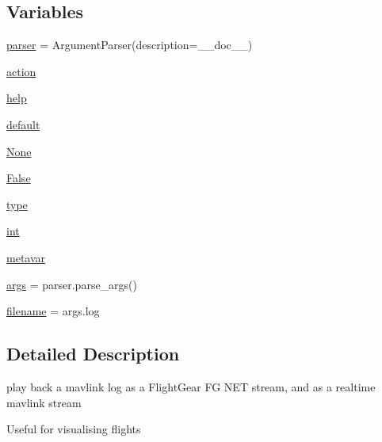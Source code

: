 \subsection*{Variables}
\begin{DoxyCompactItemize}
\item 
\mbox{\hyperlink{namespacepymavlink_1_1tools_1_1mavplayback_ac18db8fa1ca9b23e48f60e5e96e4c551}{parser}} = Argument\+Parser(description=\+\_\+\+\_\+doc\+\_\+\+\_\+)
\item 
\mbox{\hyperlink{namespacepymavlink_1_1tools_1_1mavplayback_a063a8847000068f7337569448c8c6b48}{action}}
\item 
\mbox{\hyperlink{namespacepymavlink_1_1tools_1_1mavplayback_a8188722149f5a81a20277678c5554d6d}{help}}
\item 
\mbox{\hyperlink{namespacepymavlink_1_1tools_1_1mavplayback_a645394812a210b9b5d327607febb11ea}{default}}
\item 
\mbox{\hyperlink{namespacepymavlink_1_1tools_1_1mavplayback_a5b798e76cda40436a3cbf633017fa0b6}{None}}
\item 
\mbox{\hyperlink{namespacepymavlink_1_1tools_1_1mavplayback_aa3d711ba88bb2b2ba84a0b2ad98a0b91}{False}}
\item 
\mbox{\hyperlink{namespacepymavlink_1_1tools_1_1mavplayback_a42b5bf06ac5152039a7d8135d608857c}{type}}
\item 
\mbox{\hyperlink{namespacepymavlink_1_1tools_1_1mavplayback_a1b85b4d0a9c939c3ec13ea9220f17bcb}{int}}
\item 
\mbox{\hyperlink{namespacepymavlink_1_1tools_1_1mavplayback_a87ff6cc4cad7b8bd103cc2fe7e94f23c}{metavar}}
\item 
\mbox{\hyperlink{namespacepymavlink_1_1tools_1_1mavplayback_ac755476787f4f8e494b02d8584a81c6b}{args}} = parser.\+parse\+\_\+args()
\item 
\mbox{\hyperlink{namespacepymavlink_1_1tools_1_1mavplayback_af58db67c35618bb32480880bf6cc83d3}{filename}} = args.\+log
\end{DoxyCompactItemize}


\subsection{Detailed Description}
\begin{DoxyVerb}play back a mavlink log as a FlightGear FG NET stream, and as a
realtime mavlink stream

Useful for visualising flights
\end{DoxyVerb}
 

